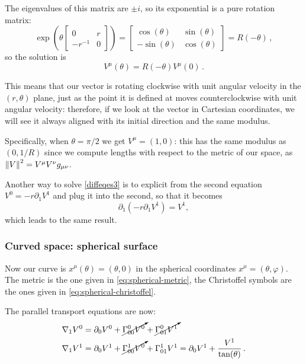 \documentclass[main.tex]{subfiles}
\begin{document}
The eigenvalues of this matrix are \(\pm i\), so its exponential is a pure rotation matrix: 
%
\begin{equation}
  \exp(\theta \left[\begin{array}{cc}
  0 & r \\ 
  -r^{-1} & 0
  \end{array}\right]) =
  \left[\begin{array}{cc}
  \cos(\theta )  & \sin(\theta )  \\ 
  -\sin(\theta )  & \cos(\theta ) 
  \end{array}\right] = R(-\theta )
\,,
\end{equation}
%
so the solution is 
%
\begin{equation}
  V^{\mu }(\theta ) = R(-\theta )V^{\mu }(0)
\,.
\end{equation}

This means that our vector is rotating clockwise with unit angular velocity in the \((r, \theta )\) plane, just as the point it is defined at moves counterclockwise with unit angular velocity: therefore, if we look at the vector in Cartesian coordinates, we will see it always aligned with its initial direction and the same modulus.

Specifically, when \(\theta = \pi /2\) we get \(V^{\mu }=(1, 0)\): this has the same modulus as \((0,1/R)\) since we compute lengths with respect to the metric of our space, as \(\norm{V}^2 = V^{\mu } V^{\nu } g_{\mu \nu }\).

Another way to solve \eqref{diffeqes3} is to explicit from the second equation $V^0=-r\partial_1V^1$ and plug it into the second, so that it becomes
\begin{equation}
\partial_1(-r\partial_1V^1)=V^1,
\end{equation}
which leads to the same result.
\subsubsection{Curved space: spherical surface}

Now our curve is \(x^{\mu } (\theta ) = (\theta , 0)\) in the spherical coordinates \(x^{\mu } = (\theta, \varphi )\). The metric is the one given in \eqref{eq:spherical-metric}, the Christoffel symbols are the ones given in \eqref{eq:spherical-christoffel}.

The parallel transport equations are now: 
%
\begin{subequations}
\begin{align}
  \nabla_{1}V^{0} &= \partial_0 V^{0} + \cancelto{}{\Gamma^{0}_{00}V^{0}} + \cancelto{}{\Gamma^{0}_{01}V^{1} }  \\
  \nabla_{1}V^{1} &= \partial_0 V^{1} + \cancelto{}{\Gamma^{1}_{00}V^{0}} + \Gamma^{1}_{01}V^{1}
  = \partial_0 V^{1} + \frac{V^{1}}{\tan(\theta )}
\,.
\end{align}
\end{subequations}
\end{document}
